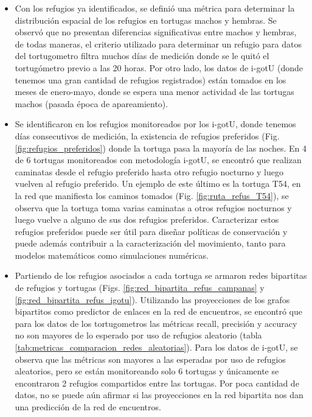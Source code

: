 \begin{itemize}
\item Con los refugios ya identificados, se definió una métrica para determinar la distribución espacial de los refugios en tortugas machos y hembras. Se observó que no presentan diferencias significativas entre machos y hembras, de todas maneras, el criterio utilizado para determinar un refugio para datos del tortugometro filtra muchos días de medición donde se le quitó el tortugómetro previo a las 20 horas. Por otro lado, los datos de i-gotU (donde tenemos una gran cantidad de refugios registrados) están tomados en los meses de enero-mayo, donde se espera una menor actividad de las tortugas machos (pasada época de apareamiento)\cite{Erika}.
 
\item Se identificaron en los refugios monitoreados por los i-gotU, donde tenemos días consecutivos de medición, la existencia de refugios preferidos (Fig. \ref{fig:refugios_preferidos}) donde la tortuga pasa la mayoría de las noches. En 4 de 6 tortugas monitoreados con metodología i-gotU, se encontró que realizan caminatas desde el refugio preferido hasta otro refugio nocturno y luego vuelven al refugio preferido. Un ejemplo de este último es la tortuga T54, en la red que manifiesta los caminos tomados (Fig. \ref{fig:ruta_refus_T54}), se observa que la tortuga  toma varias caminatas a otros refugios nocturnos y luego vuelve a alguno de sus dos refugios preferidos. Caracterizar estos refugios preferidos puede ser útil para diseñar políticas de conservación y puede además contribuir a la caracterización del movimiento, tanto para modelos matemáticos como simulaciones numéricas.
 
\item Partiendo de los refugios asociados a cada tortuga se armaron redes bipartitas de refugios y tortugas (Figs. \ref{fig:red_bipartita_refus_campanas} y \ref{fig:red_bipartita_refus_igotu}). Utilizando las proyecciones de los grafos bipartitos como predictor de enlaces en la red de encuentros, se encontró que para los datos de los tortugometros las métricas recall, precisión y accuracy no son mayores de lo esperado por uso de refugios aleatorio (tabla \ref{tab:metricas_comparacion_redes_aleatorias}). Para los datos de i-gotU, se observa que las métricas son mayores a las esperadas por uso de refugios aleatorios, pero se están monitoreando solo 6 tortugas y únicamente se encontraron 2 refugios compartidos entre las tortugas. Por poca cantidad de datos, no se puede aún afirmar si las proyecciones en la red bipartita nos dan una predicción de la red de encuentros.
 

\end{itemize}
